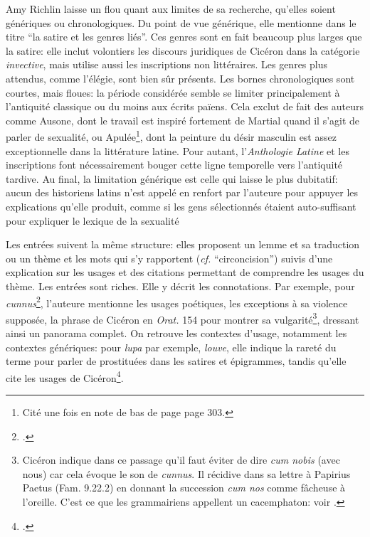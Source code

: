 Amy Richlin laisse un flou quant aux limites de sa recherche, qu'elles soient génériques ou chronologiques. Du point de vue générique, elle mentionne dans le titre \enquote{la satire et les genres liés}. Ces genres sont en fait beaucoup plus larges que la satire: elle inclut volontiers les discours juridiques de Cicéron dans la catégorie \textit{invective}, mais utilise aussi les inscriptions non littéraires. Les genres plus attendus, comme l'élégie, sont bien sûr présents. Les bornes chronologiques sont courtes, mais floues: la période considérée semble se limiter principalement à l'antiquité classique ou du moins aux écrits païens. Cela exclut de fait des auteurs comme Ausone, dont le travail est inspiré fortement de Martial quand il s'agit de parler de sexualité, ou Apulée\footnote{Cité une fois en note de bas de page page 303.}, dont la peinture du désir masculin est assez exceptionnelle dans la littérature latine. Pour autant, l'\textit{Anthologie Latine} et les inscriptions font nécessairement bouger cette ligne temporelle vers l'antiquité tardive. Au final, la limitation générique est celle qui laisse le plus dubitatif: aucun des historiens latins n'est appelé en renfort par l'auteure pour appuyer les explications qu'elle produit, comme si les gens sélectionnés étaient auto-suffisant pour expliquer le lexique de la sexualité

Les entrées suivent la même structure: elles proposent un lemme et sa traduction ou un thème et les mots qui s'y rapportent (\textit{cf.} \enquote{circoncision}) suivis d'une explication sur les usages et des citations permettant de comprendre les usages du thème. Les entrées sont riches. Elle y décrit les connotations. Par exemple, pour \textit{cunnus}\footcite[p.~208]{richlin_sexual_1978}, l'auteure mentionne les usages poétiques, les exceptions à sa violence supposée, la phrase de Cicéron en \textit{Orat.} 154 pour montrer sa vulgarité\footnote{Cicéron indique dans ce passage qu’il faut éviter de dire \textit{cum nobis} (avec nous) car cela évoque le son de \textit{cunnus}. Il récidive dans sa lettre à Papirius Paetus (Fam. 9.22.2) en donnant la succession \textit{cum nos} comme fâcheuse à l'oreille. C'est ce que les grammairiens appellent un cacemphaton: voir \textcite{nicolas2007gros}.}, dressant ainsi un panorama complet. On retrouve les contextes d'usage, notamment les contextes génériques: pour \textit{lupa} par exemple, \textit{louve}, elle indique la rareté du terme pour parler de prostituées dans les satires et épigrammes, tandis qu'elle cite les usages de Cicéron\footcite[p.~329]{richlin_sexual_1978}.

